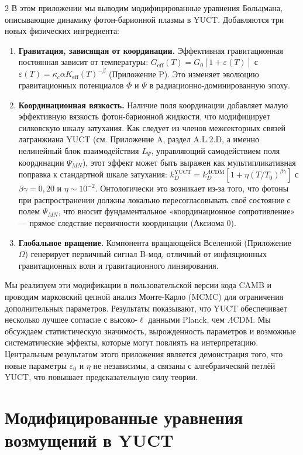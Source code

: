 \documentclass[11pt,a4paper]{article}
\begin{document}
\begin{multicols}{2}
		В этом приложении мы выводим модифицированные уравнения Больцмана, описывающие динамику фотон-барионной плазмы в YUCT. Добавляются три новых физических ингредиента:
		\begin{enumerate}
			\item \textbf{Гравитация, зависящая от координации.} Эффективная гравитационная постоянная зависит от температуры: $G_{\mathrm{eff}}(T) = G_0[1 + \varepsilon(T)]$ с $\varepsilon(T) = \kappa_c \alpha K_{\mathrm{eff}}(T)^{-\beta}$ (Приложение P). Это изменяет эволюцию гравитационных потенциалов $\Phi$ и $\Psi$ в радиационно-доминированную эпоху.
			\item \textbf{Координационная вязкость.} Наличие поля координации добавляет малую эффективную вязкость фотон-барионной жидкости, что модифицирует силковскую шкалу затухания. Как следует из членов межсекторных связей лагранжиана YUCT (см. Приложение A, раздел A.L.2.D, а именно нелинейный блок взаимодействия $L_{\Psi}$, управляющий самодействием поля координации $\Psi_{MN}$), этот эффект может быть выражен как мультипликативная поправка к стандартной шкале затухания: $k_D^{\text{YUCT}} = k_D^{\Lambda\text{CDM}} [1 + \eta (T/T_0)^{\beta\gamma}]$ с $\beta\gamma = 0,20$ и $\eta \sim 10^{-2}$. Онтологически это возникает из-за того, что фотоны при распространении должны локально пересогласовывать своё состояние с полем $\Psi_{MN}$, что вносит фундаментальное «координационное сопротивление» — прямое следствие первичности координации (Аксиома 0).
			\item \textbf{Глобальное вращение.} Компонента вращающейся Вселенной (Приложение $\Omega$) генерирует первичный сигнал B-мод, отличный от инфляционных гравитационных волн и гравитационного линзирования.
		\end{enumerate}
		
		Мы реализуем эти модификации в пользовательской версии кода CAMB и проводим марковский цепной анализ Монте-Карло (MCMC) для ограничения дополнительных параметров. Результаты показывают, что YUCT обеспечивает несколько лучшее согласие с высоко-$\ell$ данными Planck, чем $\Lambda$CDM. Мы обсуждаем статистическую значимость, вырожденность параметров и возможные систематические эффекты, которые могут повлиять на интерпретацию. Центральным результатом этого приложения является демонстрация того, что новые параметры $\varepsilon_0$ и $\eta$ не независимы, а связаны с алгебраической петлёй YUCT, что повышает предсказательную силу теории.
		
		\section{Модифицированные уравнения возмущений в YUCT}
		

\end{multicols}
\end{document}
